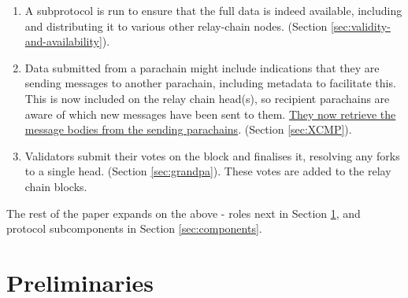 \documentclass{article}
\begin{document}
\begin{enumerate}
	\item A subprotocol is run to ensure that the full data is indeed available, including and distributing it to various other relay-chain nodes. (Section \ref{sec:validity-and-availability}).
	
	\item Data submitted from a parachain might include indications that they are sending messages to another parachain, including metadata to facilitate this. This is now included on the relay chain head(s), so recipient parachains are aware of which new messages have been sent to them. \uline{They now retrieve the message bodies from the sending parachains}. (Section \ref{sec:XCMP}).
	
	\item Validators submit their votes on the block and finalises it, resolving any forks to a single head. (Section \ref{sec:grandpa}). These votes are added to the relay chain blocks.
	
\end{enumerate}


The rest of the paper expands on the above - roles next in Section \ref{sec:preliminaries}, and protocol subcomponents in Section \ref{sec:components}.

\section{Preliminaries}\label{sec:preliminaries}

\end{document}
